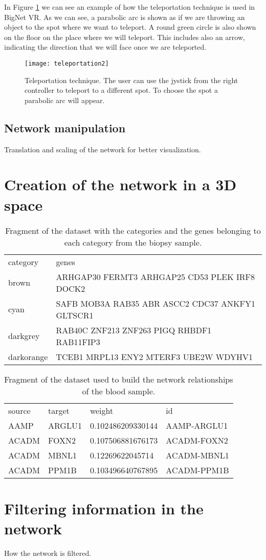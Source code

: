 In Figure \ref{fig:teleportation} we can see an example of how the teleportation technique is used in BigNet VR. As we can see, a parabolic arc is shown as if we are throwing an object to the spot where we want to teleport. A round green circle is also shown on the floor on the place where we will teleport. This includes also an arrow, indicating the direction that we will face once we are teleported.

\begin{figure}[h!]
    \centering%
    \texttt{[image: teleportation2]}
    \caption{Teleportation technique. The user can use the jystick from the right controller to teleport to a different spot. To choose the spot a parabolic arc will appear.}
    \label{fig:teleportation}
\end{figure}%

\subsection{Network manipulation}
Translation and scaling of the network for better visualization.

\section{Creation of the network in a 3D space}

\begin{table}[h!]
\centering
\begin{tabular}{ll}
\hline
category & genes          \\
brown   & ARHGAP30 FERMT3 ARHGAP25 CD53 PLEK IRF8 DOCK2\\
cyan  & SAFB MOB3A RAB35 ABR ASCC2 CDC37 ANKFY1 GLTSCR1\\
darkgrey  & RAB40C ZNF213 ZNF263 PIGQ RHBDF1 RAB11FIP3\\
darkorange  & TCEB1 MRPL13 ENY2 MTERF3 UBE2W WDYHV1\\
\hline
\end{tabular}
\caption{Fragment of the dataset with the categories and the genes belonging to each category from the biopsy sample.}
\label{tab:categories-data}
\end{table}

\begin{table}[h!]
\centering
\begin{tabular}{llll}
\hline
source & target & weight            & id          \\
AAMP   & ARGLU1 & 0.102486209330144 & AAMP-ARGLU1 \\
ACADM  & FOXN2  & 0.107506881676173 & ACADM-FOXN2 \\
ACADM  & MBNL1  & 0.12269622045714  & ACADM-MBNL1 \\
ACADM  & PPM1B  & 0.103496640767895 & ACADM-PPM1B \\
\hline
\end{tabular}
\caption{Fragment of the dataset used to build the network relationships of the blood sample.}
\label{tab:network-data}
\end{table}

\section{Filtering information in the network}
How the network is filtered.
